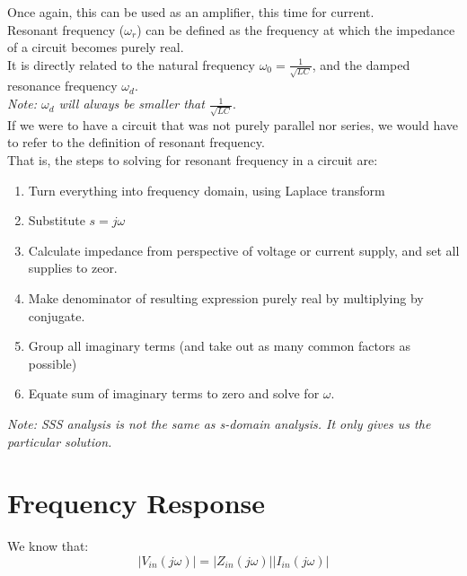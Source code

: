 \documentclass[nobib]{tufte-handout}
\begin{document}
Once again, this can be used as an amplifier, this time for current.\\
Resonant frequency ($\omega_r$) can be defined as the frequency at which the impedance of a circuit becomes purely real.\\
It is directly related to the natural frequency $\omega_0 = \frac{1}{\sqrt{LC}}$, and the damped resonance frequency $\omega_d$.\\
\textit{Note: $\omega_d$ will always be smaller that $\frac{1}{\sqrt{LC}}$}.\\
If we were to have a circuit that was not purely parallel nor series, we would have to refer to the definition of resonant frequency.\\
That is, the steps to solving for resonant frequency in a circuit are:
\begin{enumerate}
    \item Turn everything into frequency domain, using Laplace transform\\
    \item Substitute $s=j\omega$
    \item Calculate impedance from perspective of voltage or current supply, and set all supplies to zeor.
    \item Make denominator of resulting expression purely real by multiplying by conjugate.
    \item Group all imaginary terms (and take out as many common factors as possible)
    \item Equate sum of imaginary terms to zero and solve for $\omega$.
\end{enumerate}
\textit{Note: SSS analysis is not the same as s-domain analysis. It only gives us the particular solution.}
\section{Frequency Response}
We know that:
\begin{equation*}
    |V_{in}(j\omega)|=|Z_{in}(j\omega)||I_{in}(j\omega)| 
\end{equation*}
\end{document}
